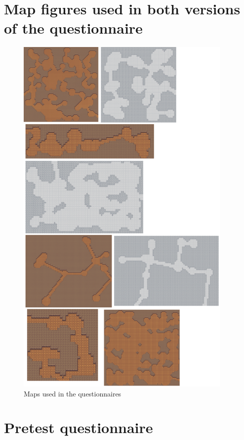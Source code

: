 \appendix

\chapter{Map figures used in both versions of the questionnaire}
\label{appendix:a}

\begin{figure}[h]
    \caption{Maps used in the questionnaires}
    \centerline{\includegraphics[width=10.505cm]{images/survey/allmaps.png}}
\end{figure}

\chapter{Pretest questionnaire}
\label{appendix:b}

